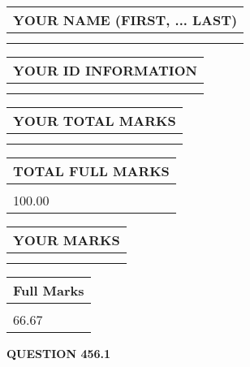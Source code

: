 \documentclass{ctexart}
\begin{document}
   
   
   
\newpage 
\setcounter{page}{ 
   456001 } 
   
   
   
   
\noindent\begin{tabular}{|l|}
\hline
YOUR NAME (FIRST, ... LAST)  \\
\hline
 \\ 
 \\ 
\hline
\end{tabular}
\hspace{0.05in} \begin{tabular}{|l|}
\hline
 YOUR   ID   INFORMATION  \\
\hline
 \\ 
 \\ 
\hline
\end{tabular}
   
   
\vspace{0.2in}\noindent\begin{tabular}{|l|}
\hline
YOUR TOTAL MARKS  \\
\hline
 \\ 
 \\ 
\hline
\end{tabular}
\hspace{0.05in} \begin{tabular}{|l|}
\hline
TOTAL FULL MARKS  \\
\hline
 \\ 
100.00 \\
\hline
\end{tabular}
   
   
 \vspace{0.2in}
 
 
 
 
   
   
  
\vspace{0.2in}
  
\noindent\begin{tabular}{|l|}
\hline
 YOUR MARKS  \\
\hline
 \\ 
 \\ 
\hline
\end{tabular}
\hspace{0.05in} \begin{tabular}{|l|}
\hline
 Full Marks  \\
\hline
 \\ 
66.67 \\
\hline
\end{tabular}
{\textbf{\Large{QUESTION
456.1 
}}}
  
\end{document}
